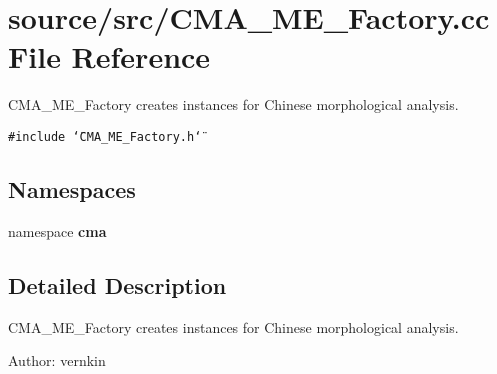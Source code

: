 \section{source/src/CMA\_\-ME\_\-Factory.cc File Reference}
\label{CMA__ME__Factory_8cc}
CMA\_\-ME\_\-Factory creates instances for Chinese morphological analysis. 

{\tt \#include \char`\"{}CMA\_\-ME\_\-Factory.h\char`\"{}}\par
\subsection*{Namespaces}
\begin{CompactItemize}
\item 
namespace \textbf{cma}
\end{CompactItemize}


\subsection{Detailed Description}
CMA\_\-ME\_\-Factory creates instances for Chinese morphological analysis. 

\begin{Desc}
\item[Author:]vernkin \end{Desc}
